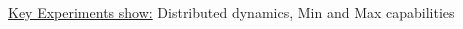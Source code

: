 \documentclass[	hyperref={pdfpagelabels=false}, xcolor=dvipsnames,
		11pt]{beamer}
\begin{document}
\begin{frame}
\begin{columns}
\begin{column}{5cm}
\begin{overprint}
{\begin{minipage}[t]{5 cm}
\begin{figure}[h]
\begin{center}
		\end{center}
	\end{figure}
	\end{minipage} }

	\end{overprint}
	\end{column}
	\end{columns}

	\begin{alertblock}{\underline{Key Experiments show:}}
		Distributed dynamics, Min and Max capabilities
	\end{alertblock}
\end{frame}
\end{document}
